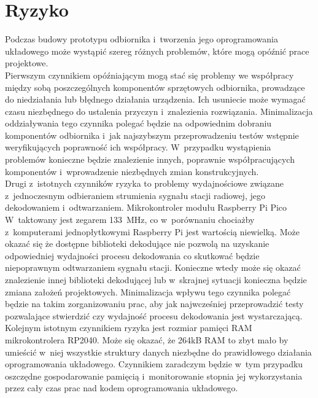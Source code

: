 \documentclass[polish]{aghengthesis}
\begin{document}
	\section{Ryzyko}
		Podczas budowy prototypu odbiornika i~tworzenia jego oprogramowania układowego może wystąpić szereg różnych problemów, które mogą opóźnić prace projektowe.
		$ $\\
		
		Pierwszym czynnikiem opóźniającym mogą stać się problemy we współpracy między sobą poszczególnych komponentów sprzętowych odbiornika, prowadzące do niedziałania lub błędnego działania urządzenia. Ich usuniecie może wymagać czasu niezbędnego do ustalenia przyczyn i~znalezienia rozwiązania. Minimalizacja oddziaływania tego czynnika polegać będzie na odpowiednim dobraniu komponentów odbiornika i~jak najszybszym przeprowadzeniu testów wstępnie weryfikujących poprawność ich współpracy. W~przypadku wystąpienia problemów konieczne będzie znalezienie innych, poprawnie współpracujących komponentów i~wprowadzenie niezbędnych zmian konstrukcyjnych.
		$ $\\
		
		Drugi z~istotnych czynników ryzyka to problemy wydajnościowe związane z~jednoczesnym odbieraniem strumienia sygnału stacji radiowej, jego dekodowaniem i~odtwarzaniem. Mikrokontroler modułu Raspberry Pi Pico W~taktowany jest zegarem 133~MHz, co  w~porównaniu chociażby z~komputerami jednopłytkowymi Raspberry Pi jest wartością niewielką. Może okazać się że dostępne biblioteki dekodujące nie pozwolą na uzyskanie odpowiedniej wydajności procesu dekodowania co skutkować będzie niepoprawnym odtwarzaniem sygnału stacji. Konieczne wtedy może się okazać znalezienie innej biblioteki dekodującej lub w~skrajnej sytuacji konieczna będzie zmiana założeń projektowych. Minimalizacja wpływu tego czynnika polegać będzie na takim zorganizowaniu prac, aby jak najwcześniej przeprowadzić testy pozwalające stwierdzić czy wydajność procesu dekodowania jest wystarczającą. 
		$ $\\
		
		Kolejnym istotnym czynnikiem ryzyka jest rozmiar pamięci RAM mikrokontrolera RP2040.  Może się okazać, że 264kB RAM to zbyt mało by umieścić w~niej wszystkie struktury danych niezbędne do  prawidłowego działania oprogramowania układowego. Czynnikiem zaradczym będzie w~tym przypadku oszczędne gospodarowanie pamięcią i~monitorowanie stopnia jej wykorzystania przez cały czas prac nad kodem oprogramowania układowego.
		$ $\\
		
\end{document}
